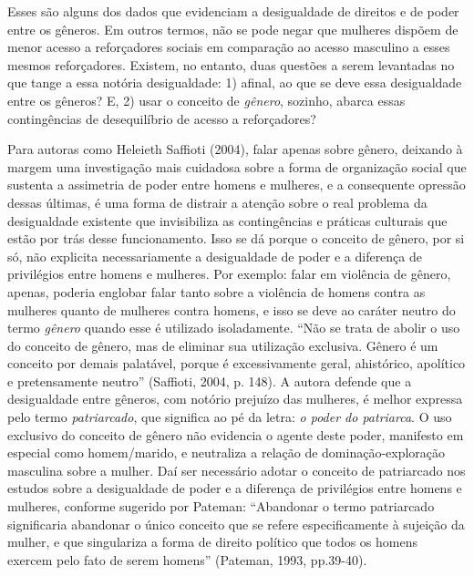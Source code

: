 Esses são alguns dos dados que evidenciam a desigualdade de direitos e de poder entre os gêneros. Em outros termos, não se pode negar que mulheres dispõem de menor acesso a reforçadores sociais em comparação ao acesso masculino a esses mesmos reforçadores. Existem, no entanto, duas questões a serem levantadas no que tange a essa notória desigualdade: 1) afinal, ao que se deve essa desigualdade entre os gêneros? E, 2) usar o conceito de \textit{gênero}, sozinho, abarca essas contingências de desequilíbrio de acesso a reforçadores?

Para autoras como Heleieth Saffioti (2004), falar apenas sobre gênero, deixando à margem uma investigação mais cuidadosa sobre a forma de organização social que sustenta a assimetria de poder entre homens e mulheres, e a consequente opressão dessas últimas, é uma forma de distrair a atenção sobre o real problema da desigualdade existente que invisibiliza as contingências e práticas culturais que estão por trás desse funcionamento. Isso se dá porque o conceito de gênero, por si só, não explicita necessariamente a desigualdade de poder e a diferença de privilégios entre homens e mulheres. Por exemplo: falar em violência de gênero, apenas, poderia englobar falar tanto sobre a violência de homens contra as mulheres quanto de mulheres contra homens, e isso se deve ao caráter neutro do termo \textit{gênero} quando esse é utilizado isoladamente. ``Não se trata de abolir o uso do conceito de gênero, mas de eliminar sua utilização exclusiva. Gênero é um conceito por demais palatável, porque é excessivamente geral, ahistórico, apolítico e pretensamente neutro'' (Saffioti, 2004, p. 148). A autora defende que a desigualdade entre gêneros, com notório prejuízo das mulheres, é melhor expressa pelo termo \textit{patriarcado}, que significa ao pé da letra: \textit{o poder do patriarca}. O uso exclusivo do conceito de gênero não evidencia o agente deste poder, manifesto em especial como homem/marido, e neutraliza a relação de dominação-exploração masculina sobre a mulher. Daí ser necessário adotar o conceito de patriarcado nos estudos sobre a desigualdade de poder e a diferença de privilégios entre homens e mulheres, conforme sugerido por Pateman: ``Abandonar o termo patriarcado significaria abandonar o único conceito que se refere especificamente à sujeição da mulher, e que singulariza a forma de direito político que todos os homens exercem pelo fato de serem homens'' (Pateman, 1993, pp.39-40).

